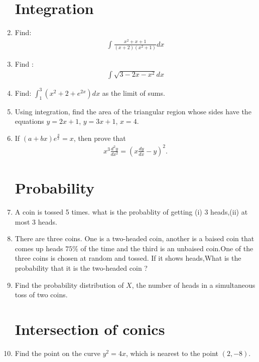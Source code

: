 \documentclass[2pt,-letter paper]{article}
\providecommand{\brak}[1]{\ensuremath{\left(#1\right)}}
\begin{document}
\begin{enumerate}
\section{Integration}
\item Find: \begin{align*}\int{\frac{x^2+x+1}{\brak{x+2}\brak{x^2+1}}}dx\end{align*}		
\item Find :                                            \begin{align*} \int{\sqrt{3 - 2x - x^2}}{dx} \end{align*}
\item Find: $\int_{1}^{3}{\brak{x^2+2+e^{2x}}}dx$ as the limit of sums.           
\item Using integration, find the area of the triangular region whose sides have the equations $y = 2x + 1$, $y= 3x + 1$, $x = 4$.
\item If $\brak{a + bx}e^\frac{y}{x}=x$, then prove that\begin{align*}                                         x^3\frac{d^2y}{dx^2} = \brak{x\frac{dy}{dx}-y}^2. \end{align*}
\section{Probability}
\item A coin is tossed 5 times. what is the probablity     of getting ({i}) 3 heads,({ii}) at most 3 heads.
\item There are three coins. One is a two-headed coin,  another is a baised coin that comes up heads $75\%$ of the time and the third is an unbaised coin.One of the three coins is chosen at random and tossed. If it shows heads,What is the probability that it is the two-headed coin ?
\item Find the probability distribution of $X$, the number of heads in a simultaneous toss of two coins.
\section{Intersection of conics}
\item Find the point on the curve $y^2 = 4x$, which is nearest to the point $\brak{2,-8}$.
\end{enumerate}
\end{document}
